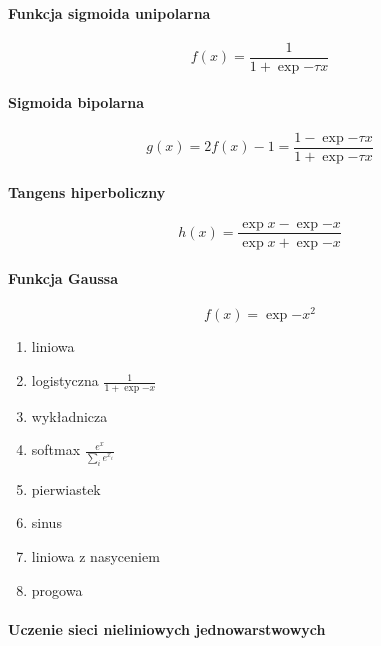 \paragraph{Funkcja sigmoida unipolarna}

\begin{equation}
 f(x)  = \frac{1}{1 + \exp{- \tau x}}
\end{equation}

\paragraph{Sigmoida bipolarna}

\begin{equation}
 g(x) = 2 f(x) - 1 = \frac{ 1 - \exp{- \tau x} }{1 + \exp{- \tau x}}
\end{equation}

\paragraph{Tangens hiperboliczny}

\begin{equation}
 h(x) = \frac{ \exp{x} - \exp{-x} }{ \exp{x} + \exp{-x}}
\end{equation}

\paragraph{Funkcja Gaussa}

\begin{equation}
 f(x) = \exp{-x^2}
\end{equation}

\begin{enumerate}
 \item liniowa
 \item logistyczna $\frac{1}{1 + \exp{-x}}$
 \item wykładnicza
 \item softmax $\frac{e^x}{ \sum_i e^{x_i}}$
 \item pierwiastek
 \item sinus
 \item liniowa z nasyceniem
 \item progowa
\end{enumerate}

\paragraph{Uczenie sieci nieliniowych jednowarstwowych}

